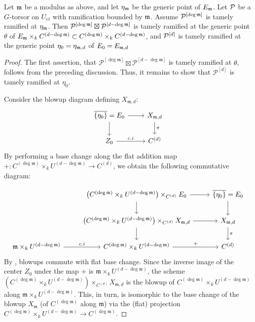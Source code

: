 \begin{cor}\label{cor:tame-ramification-symmetric-product}
     Let $\mathfrak{m}$ be a modulus as above, and let $\eta_{\mathfrak{m}}$ be the generic point of $E_{\mathfrak{m}}$.
     Let $\mathcal{P}$ be a $G$-torsor on $U_{et}$ with ramification bounded by $\mathfrak{m}$.
     Assume $\mathcal{P}^{[\deg \mathfrak{m}]}$ is tamely ramified at $\eta_{\mathfrak{m}}$.
     Then ${\mathcal{P}^{[\deg \mathfrak{m}]}} \boxtimes \mathcal{P}^{[d - \deg \mathfrak{m}]}$ is tamely ramified at the generic point $\theta$ of 
     $E_{\mathfrak{m}} \times_k C^{(d-\deg \mathfrak{m})} \subset C^{(\deg \mathfrak{m})} \times_k C^{(d - \deg \mathfrak{m})}$,
     and $\mathcal{P}^{[d]}$ is tamely ramified at the generic point $\eta_0=\eta_{\mathfrak{m},d}$ of $E_0=E_{\mathfrak{m},d}$
\end{cor}
\begin{proof} 
The first assertion, that $\mathcal{P}^{[\deg \mathfrak{m}]} \boxtimes \mathcal{P}^{[d - \deg \mathfrak{m}]}$ is tamely ramified at $\theta$, follows from the preceding discussion. Thus, it remains to show that $\mathcal{P}^{[d]}$ is tamely ramified at $\eta_0$.

Consider the blowup diagram defining $X_{\mathfrak{m}, d}$:
\[
\begin{tikzcd}
\overline{\{\eta_0 \}} =  E_0 \arrow[r] \arrow[d] & X_{\mdls, d} \arrow[d, "\pi"] \\
Z_0 \arrow[r, "c.i"]           & C^{(d)}          
\end{tikzcd}
\] 
By performing a base change along the flat addition map $+: C^{(\deg \mathfrak{m})} \times_k U^{(d-\deg \mathfrak{m})} \to C^{(d)}$, we obtain the following commutative diagram:

\[
\begin{tikzcd}
&  \left(C^{(\deg \mdls)} \times_k U^{(d-\deg \mdls)} \right) \times_{C^{(d)}} E_0 \arrow[r] \arrow[d] & \overline{\{\eta_0 \}} =  E_0 \arrow[d] \\
& \left(C^{(\deg \mdls)} \times_k U^{(d-\deg \mdls)} \right) \times_{C^{(d)}} X_{\mdls, d} \arrow[d] \arrow[r] & X_{\mdls, d} \arrow[d, "\pi"] \\
\mdls \times_k U^{(d-\deg \mdls)} \arrow[r, "c.i"] & C^{(\deg \mdls)} \times_k U^{(d-\deg \mdls)} \arrow[r, "+"]  & C^{(d)}          
\end{tikzcd}
\] 
By , blowups commute with flat base
change. Since the inverse image of the center $Z_0$ under the map $+$ is
$\mathfrak{m} \times_k U^{(d-\deg \mathfrak{m})}$, the scheme
$\left(C^{(\deg \mathfrak{m})} \times_k U^{(d-\deg \mathfrak{m})} \right)
\times_{C^{(d)}} X_{\mathfrak{m}, d}$ is the blowup of
$C^{(\deg \mathfrak{m})} \times_k U^{(d-\deg \mathfrak{m})}$ along
$\mathfrak{m} \times_k U^{(d-\deg \mathfrak{m})}$.
This, in turn, is isomorphic to the base change of the blowup $X_{\mathfrak{m}}$ (of $C^{(\deg \mathfrak{m})}$ along $\mathfrak{m}$) via the (flat) projection $C^{(\deg \mathfrak{m})} \times_k U^{(d - \deg \mathfrak{m})} \to C^{(\deg \mathfrak{m})}$.


\end{proof}
